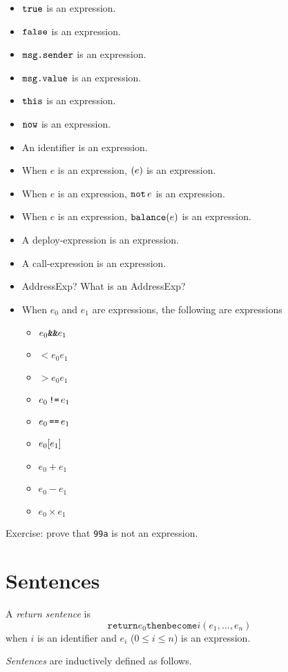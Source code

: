 \documentclass{book}
\begin{document}
\begin{itemize}
\item $\text{\texttt{true}}$ is an expression.
\item $\text{\texttt{false}}$ is an expression.
\item $\text{\texttt{msg.sender}}$ is an expression.
\item $\text{\texttt{msg.value}}$ is an expression.
\item $\text{\texttt{this}}$ is an expression.
\item $\text{\texttt{now}}$ is an expression.
\item An identifier is an expression.
\item When $e$ is an expression, $\mathtt{(}{e}\mathtt{)}$ is an expression.
\item When $e$ is an expression, $\mathop{\text{\texttt{not}}}{e}$ is an expression.
\item When $e$ is an expression, $\text{\texttt{balance}}\mathtt{(}{e}\mathtt{)}$ is an expression.
\item A deploy-expression is an expression.
\item A call-expression is an expression.
\item AddressExp?  What is an AddressExp?
\item When $e_0$ and $e_1$ are expressions, the following are expressions
\begin{itemize}
\item ${e_0}\mathbin{\text{\texttt{\&\&}}{e_1}}$
\item $\lt{e_0}{e_1}$
\item $\gt{e_0}{e_1}$
\item ${e_0} \mathop{\text{\texttt{!=}}} {e_1}$
\item ${e_0} \mathop{\text{\texttt{==}}} {e_1}$
\item ${e_0}[{e_1}]$
\item $e_0 + e_1$
\item $e_0 - e_1$
\item $e_0 \times e_1$
\end{itemize}
\end{itemize}

Exercise: prove that \texttt{99a} is not an expression.

\section{Sentences}

A \textit{return sentence} is
\[
\texttt{return} e_0 \texttt{then} \texttt{become} i(e_1,\ldots,e_n)
\]
when $i$ is an identifier and $e_i$ ($0 \le i \le n$) is an expression.

\textit{Sentences} are inductively defined as follows.
\end{document}
